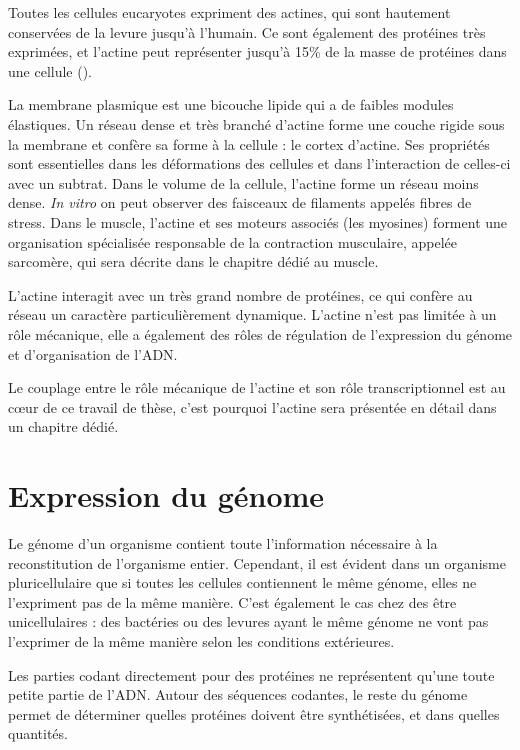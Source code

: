 Toutes les cellules eucaryotes expriment des actines, qui sont hautement conservées de la levure jusqu'à l'humain. Ce sont également des protéines très exprimées, et l'actine peut représenter jusqu'à 15\% de la masse de protéines dans une cellule (\cite{alberts_molecular_2002}).

La membrane plasmique est une bicouche lipide qui a de faibles modules élastiques. Un réseau dense et très branché d'actine forme une couche rigide sous la membrane et confère sa forme à la cellule : le cortex d'actine. Ses propriétés sont essentielles dans les déformations des cellules et dans l'interaction de celles-ci avec un subtrat. 
Dans le volume de la cellule, l'actine forme un réseau moins dense. \textit{In vitro} on peut observer des faisceaux de filaments appelés fibres de stress. 
Dans le muscle, l'actine et ses moteurs associés (les myosines) forment une organisation spécialisée responsable de la contraction musculaire, appelée sarcomère, qui sera décrite dans le chapitre dédié au muscle.

L'actine interagit avec un très grand nombre de protéines, ce qui confère au réseau un caractère particulièrement dynamique. L'actine n'est pas limitée à un rôle mécanique, elle a également des rôles de régulation de l'expression du génome et d'organisation de l'ADN. 

Le couplage entre le rôle mécanique de l'actine et son rôle transcriptionnel est au c\oe ur de ce travail de thèse, c'est pourquoi l'actine sera présentée en détail dans un chapitre dédié. 




\section{Expression du génome}

Le génome d'un organisme contient toute l'information nécessaire à la reconstitution de l'organisme entier. Cependant, il est évident dans un organisme pluricellulaire que si toutes les cellules contiennent le même génome, elles ne l'expriment pas de la même manière. C'est également le cas chez des être unicellulaires : des bactéries ou des levures ayant le même génome ne vont pas l'exprimer de la même manière selon les conditions extérieures. 

Les parties codant directement pour des protéines ne représentent qu'une toute petite partie de l'ADN. Autour des séquences codantes, le reste du génome permet de déterminer quelles protéines doivent être synthétisées, et dans quelles quantités. 

